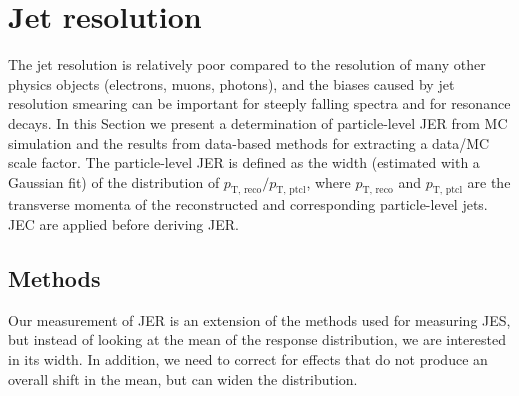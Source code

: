 \documentclass[11pt,twoside,a4paper,cmspaper,final,collab]{cms-tdr}
\begin{document}
\section{Jet \texorpdfstring{\pt}{pT} resolution}
\label{sec:jer}

The jet \pt resolution is relatively poor compared to the resolution of many other physics objects (electrons, muons, photons), and the biases caused by jet resolution smearing can be important for steeply falling spectra and for resonance decays. In this Section we present a determination of particle-level JER from MC simulation and the results from data-based methods for extracting a data/MC scale factor. The particle-level JER is defined as the width (estimated with a Gaussian fit) of the distribution of $p_\text{T, reco}/p_\text{T, ptcl}$, where $p_\text{T, reco}$ and $p_\text{T, ptcl}$ are the transverse momenta of the reconstructed and corresponding particle-level jets. JEC are applied before deriving JER.

\subsection{Methods}
Our measurement of JER is an extension of the methods used for measuring JES, but instead of looking at the mean of the response distribution, we are interested in its width. In addition, we need to correct for effects that do not produce an overall shift in the mean, but can widen the distribution.
\end{document}
